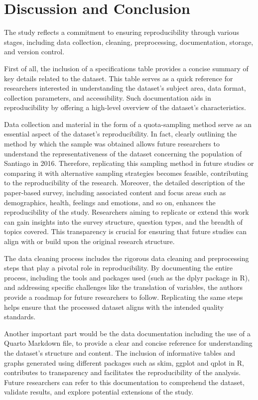 \documentclass[
11pt, %
oneside, %
english, %
singlespacing, %
]{macthesis} %
\begin{document}
\hypertarget{discussion-and-conclusion}{%
\section{Discussion and Conclusion}\label{discussion-and-conclusion}}

The study reflects a commitment to ensuring reproducibility through various stages, including data collection, cleaning, preprocessing, documentation, storage, and version control.

First of all, the inclusion of a specifications table provides a concise summary of key details related to the dataset. This table serves as a quick reference for researchers interested in understanding the dataset's subject area, data format, collection parameters, and accessibility. Such documentation aids in reproducibility by offering a high-level overview of the dataset's characteristics.

Data collection and material in the form of a quota-sampling method serve as an essential aspect of the dataset's reproducibility. In fact, clearly outlining the method by which the sample was obtained allows future researchers to understand the representativeness of the dataset concerning the population of Santiago in 2016. Therefore, replicating this sampling method in future studies or comparing it with alternative sampling strategies becomes feasible, contributing to the reproducibility of the research. Moreover, the detailed description of the paper-based survey, including associated content and focus areas such as demographics, health, feelings and emotions, and so on, enhances the reproducibility of the study. Researchers aiming to replicate or extend this work can gain insights into the survey structure, question types, and the breadth of topics covered. This transparency is crucial for ensuring that future studies can align with or build upon the original research structure.

The data cleaning process includes the rigorous data cleaning and preprocessing steps that play a pivotal role in reproducibility. By documenting the entire process, including the tools and packages used (such as the dplyr package in R), and addressing specific challenges like the translation of variables, the authors provide a roadmap for future researchers to follow. Replicating the same steps helps ensure that the processed dataset aligns with the intended quality standards.

Another important part would be the data documentation including the use of a Quarto Markdown file, to provide a clear and concise reference for understanding the dataset's structure and content. The inclusion of informative tables and graphs generated using different packages such as skim, ggplot and qplot in R, contributes to transparency and facilitates the reproducibility of the analysis. Future researchers can refer to this documentation to comprehend the dataset, validate results, and explore potential extensions of the study.
\end{document}
